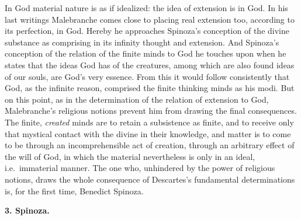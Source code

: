 In God material nature is as if idealized: the idea of extension is in
God. In his last writings Malebranche comes close to placing real
extension too, according to its perfection, in God. Hereby he
approaches Spinoza's conception of the divine substance as comprising in
its infinity thought and extension. And Spinoza's conception of the
relation of the finite minds to God he touches upon when he states
that the ideas God has of the creatures, among which are also found
ideas of our souls, are God's very essence. From this it would follow
consistently that God, as the infinite reason, comprised the finite
thinking minds as his modi. But on this point, as in the determination
of the relation of extension to God, Malebranche's religious notions
prevent him from drawing the final consequences. The finite,
\emph{created} minds are to retain a subsistence as finite, and to
receive only that mystical contact with the divine in their knowledge,
and matter is to come to be through an incomprehensible act of
creation, through an arbitrary effect of the will of God, in which the
material nevertheless is only in an ideal, i.e.\ immaterial manner. The
one who, unhindered by the power of religious notions, draws the whole
consequence of Descartes's fundamental determinations is, for the first
time, Benedict Spinoza.

\divrule

\begin{center}
  \textbf{3. Spinoza.}
\end{center}

